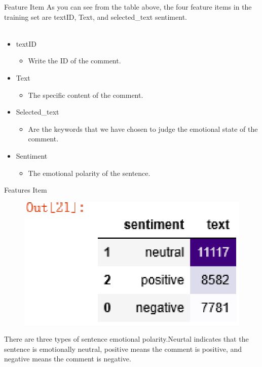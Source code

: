 \documentclass[
 size=14pt,
 paper=smartboard,  %
 mode=present, 		%
 display=slides, 	%
 style=tuliplab,  	%
 pauseslide,
 fleqn,leqno]{powerdot}
\begin{document}
\begin{slide}{Feature Item}
  As you can see from the table above, the four feature
  items in the training set are textID, Text, and selected_text sentiment.
  ~\\
  ~\\
  \bigskip
  \begin{itemize}
    \item textID
    \begin{itemize}
      \item Write the ID of the comment.
    \end{itemize}
    \item Text
    \begin{itemize}
      \item The specific content of the comment.
    \end{itemize}
    \item Selected_text
    \begin{itemize}
      \item Are the keywords that we have chosen to 
      judge the emotional state of the comment.
    \end{itemize}
    \item Sentiment
    \begin{itemize}
      \item The emotional polarity of the sentence.
    \end{itemize}
  \end{itemize}
\end{slide}

\begin{slide}{Features Item}
  \begin{figure}
    \centering
    \includegraphics[width=1\textwidth]{kaggle/01.3.eps}
  \end{figure}
  
  \bigskip
  There are three types of sentence emotional polarity.Neurtal
   indicates that the sentence is emotionally neutral, positive
    means the comment is positive, and negative means the 
    comment is negative.
\end{slide}
\end{document}
